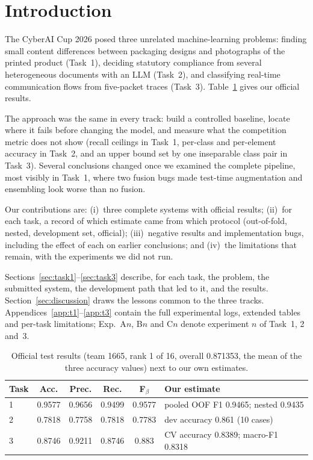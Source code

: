 \documentclass[runningheads]{llncs}
\begin{document}
\section{Introduction}
\label{sec:intro}

The CyberAI Cup 2026 posed three unrelated machine-learning problems: finding small
content differences between packaging designs and photographs of the printed product
(Task~1), deciding statutory compliance from several heterogeneous documents with an
LLM (Task~2), and classifying real-time communication flows from five-packet traces
(Task~3). Table~\ref{tab:official} gives our official results.

The approach was the same in every track: build a controlled baseline, locate where
it fails before changing the model, and measure what the competition metric does not
show (recall ceilings in Task~1, per-class and per-element accuracy in Task~2, and an
upper bound set by one inseparable class pair in Task~3). Several conclusions changed
once we examined the complete pipeline, most visibly in Task~1, where two fusion bugs
made test-time augmentation and ensembling look worse than no fusion.

Our contributions are: (i)~three complete systems with official results; (ii)~for
each task, a record of which estimate came from which protocol (out-of-fold, nested,
development set, official); (iii)~negative results and implementation bugs, including
the effect of each on earlier conclusions; and (iv)~the limitations that remain, with
the experiments we did not run.

Sections~\ref{sec:task1}--\ref{sec:task3} describe, for each task, the problem, the
submitted system, the development path that led to it, and the results.
Section~\ref{sec:discussion} draws the lessons common to the three tracks.
Appendices~\ref{app:t1}--\ref{app:t3} contain the full experimental logs, extended
tables and per-task limitations; Exp.~A$n$, B$n$ and C$n$ denote experiment $n$ of
Task~1, 2 and~3.

\begin{table}
\caption{Official test results (team 1665, rank 1 of 16, overall 0.871353, the mean of the three accuracy values) next to our own estimates.}\label{tab:official}
\centering
\small\setlength{\tabcolsep}{4pt}
\begin{tabular}{lcccc>{\raggedright\arraybackslash}p{4.3cm}}
\toprule
Task & Acc. & Prec. & Rec. & F$_\beta$ & Our estimate \\
\midrule
1 & 0.9577 & 0.9656 & 0.9499 & 0.9577 & pooled OOF F1 0.9465; nested 0.9435 \\
2 & 0.7818 & 0.7758 & 0.7818 & 0.7783 & dev accuracy 0.861 (10 cases) \\
3 & 0.8746 & 0.9211 & 0.8746 & 0.883 & CV accuracy 0.8389; macro-F1 0.8318 \\
\bottomrule
\end{tabular}
\end{table}
\end{document}
